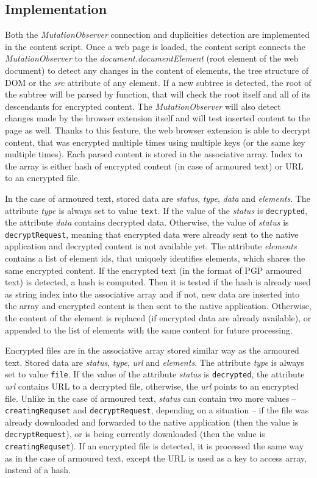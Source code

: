 \subsection{Implementation}
Both the \textit{MutationObserver} connection and duplicities detection are implemented in the content script. Once a web page is loaded, the content script connects the \textit{MutationObserver} to the \textit{document.documentElement} (root element of the web document) to detect any changes in the content of elements, the tree structure of DOM or the \textit{src} attribute of any element. If a new subtree is detected, the root of the subtree will be parsed by function, that will check the root itself and all of its descendants for encrypted content. The \textit{MutationObserver} will also detect changes made by the browser extension itself and will test inserted content to the page as well. Thanks to this feature, the web browser extension is able to decrypt content, that was encrypted multiple times using multiple keys (or the same key multiple times). Each parsed content is stored in the associative array. Index to the array is either hash of encrypted content (in case of armoured text) or URL to an encrypted file.

In the case of armoured text, stored data are \textit{status}, \textit{type}, \textit{data} and \textit{elements}. The attribute \textit{type} is always set to value \texttt{text}. If the value of the \textit{status} is \texttt{decrypted}, the attribute \textit{data} contains decrypted data. Otherwise, the value of \textit{status} is \texttt{decryptRequest}, meaning that encrypted data were already sent to the native application and decrypted content is not available yet. The attribute \textit{elements} contains a list of element ids, that uniquely identifies elements, which shares the same encrypted content. If the encrypted text (in the format of PGP armoured text) is detected, a hash is computed. Then it is tested if the hash is already used as string index into the associative array and if not, new data are inserted into the array and encrypted content is then sent to the native application. Otherwise, the content of the element is replaced (if encrypted data are already available), or appended to the list of elements with the same content for future processing.

Encrypted files are in the associative array stored similar way as the armoured text. Stored data are \textit{status}, \textit{type}, \textit{url} and \textit{elements}. The attribute \textit{type} is always set to value \texttt{file}. If the value of the attribute \textit{status} is \texttt{decrypted}, the attribute \textit{url} contains URL to a decrypted file, otherwise, the \textit{url} points to an encrypted file. Unlike in the case of armoured text, \textit{status} can contain two more values -- \texttt{creatingRequset} and \texttt{decryptRequest}, depending on a situation -- if the file was already downloaded and forwarded to the native application (then the value is \texttt{decryptRequest}), or is being currently downloaded (then the value is \texttt{creatingRequset}). If an encrypted file is detected, it is processed the same way as in the case of armoured text, except the URL is used as a key to access array, instead of a hash.

